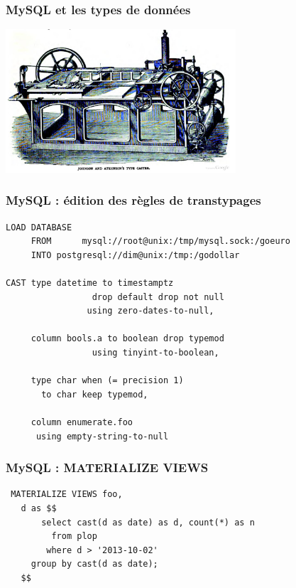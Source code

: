 \documentclass{beamer}
\begin{document}
\begin{frame}
  \frametitle{MySQL et les types de données}

  
  \begin{center}
    \includegraphics[height=2.1in]{type-casting-machine.jpg}
  \end{center}
\end{frame}

\begin{frame}[fragile]
  \frametitle{MySQL : édition des règles de transtypages}

\begin{verbatim}
LOAD DATABASE
     FROM      mysql://root@unix:/tmp/mysql.sock:/goeuro
     INTO postgresql://dim@unix:/tmp:/godollar

CAST type datetime to timestamptz
                 drop default drop not null
                using zero-dates-to-null,

     column bools.a to boolean drop typemod
                 using tinyint-to-boolean,

     type char when (= precision 1)
       to char keep typemod,

     column enumerate.foo
      using empty-string-to-null
\end{verbatim}
\end{frame}

\begin{frame}[fragile]
  \frametitle{MySQL : MATERIALIZE VIEWS}

  \vfill
  
\begin{verbatim}
 MATERIALIZE VIEWS foo,
   d as $$
       select cast(d as date) as d, count(*) as n
         from plop
        where d > '2013-10-02'
     group by cast(d as date);
   $$
\end{verbatim}
\end{frame}
\end{document}
